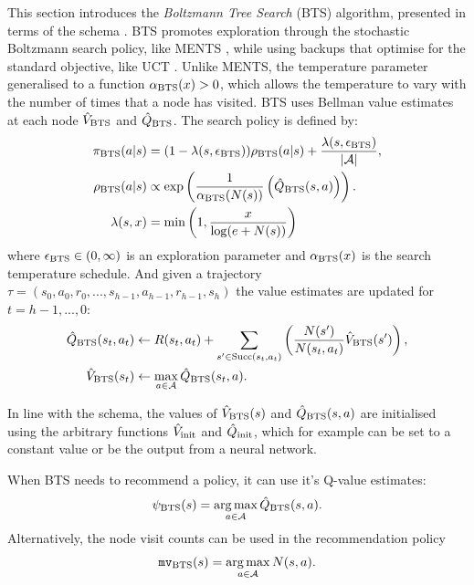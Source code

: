         This section introduces the \textit{Boltzmann Tree Search} (BTS) algorithm, presented in terms of the \thtspp\ewe schema . BTS promotes exploration through the stochastic Boltzmann search policy, like MENTS , while using backups that optimise for the standard objective, like UCT . Unlike MENTS, the temperature parameter generalised to a function ${\alpha_{{\textnormal{BTS}}}}(x) > 0$, which allows the temperature to vary with the number of times that a node has visited. BTS uses Bellman value estimates at each node ${\hat{V}_{{\textnormal{BTS}}}}$ and ${\hat{Q}_{{\textnormal{BTS}}}}$. The search policy is defined by:
        \begin{align}
            {\pi_{{\textnormal{BTS}}}}(a|s) &= (1-{\lambda(s,{\epsilon_{{\textnormal{BTS}}}})}){\rho_{{\textnormal{BTS}}}}(a|s) + \frac{{\lambda(s,{\epsilon_{{\textnormal{BTS}}}})}}{|\mathcal{A}|}, 
                        \label{eq:4:bts_search_policy} \\ 
            {\rho_{{\textnormal{BTS}}}}(a|s) &\propto \exp\left(\frac{1}{{\alpha_{{\textnormal{BTS}}}}(N(s))}\left({\hat{Q}_{{\textnormal{BTS}}}}(s,a)\right)\right).
                        \label{eq:4:bts_value_policy} \\
            \lambda(s,x) &= \min\left(1, \frac{x}{\log(e+N(s))}\right) \label{eq:4:lambda}
        \end{align}
        where ${\epsilon_{{\textnormal{BTS}}}} \in (0,\infty)$ is an exploration parameter and ${\alpha_{{\textnormal{BTS}}}}(x)$ is the search temperature schedule.  And given a trajectory $\tau=(s_0,a_0,r_0,...,s_{h-1},a_{h-1},r_{h-1},s_h)$ the value estimates are updated for $t=h-1,...,0$:
        \begin{align}
            {\hat{Q}_{{\textnormal{BTS}}}}(s_t,a_t) &\leftarrow 
                R(s_t,a_t) + \sum_{s' \in {\textnormal{Succ}(s_t,a_t)}} \left( \frac{N(s')}{N(s_t,a_t)} {\hat{V}_{{\textnormal{BTS}}}}(s') \right), 
                        \label{eq:4:bts_backup_q} \\ 
            {\hat{V}_{{\textnormal{BTS}}}}(s_t) &\leftarrow \max_{a\in\mathcal{A}} {\hat{Q}_{{\textnormal{BTS}}}}(s_t,a).
                        \label{eq:4:bts_backup_v} 
        \end{align}
        
        In line with the \thtspp\ewe schema, the values of $\hat{V}_{{\textnormal{BTS}}}(s)$ and $\hat{Q}_{{\textnormal{BTS}}}(s,a)$ are initialised using the arbitrary functions ${\hat{V}_{\textnormal{init}}}$ and ${\hat{Q}_{\textnormal{init}}}$, which for example can be set to a constant value or be the output from a neural network.  
        
        
        When BTS needs to recommend a policy, it can use it's Q-value estimates:
        \begin{align}
            {\psi_{{\textnormal{BTS}}}}(s)=\operatorname*{arg\,max}_{a\in\mathcal{A}}{\hat{Q}_{{\textnormal{BTS}}}}(s,a).
        \end{align}
        Alternatively, the node visit counts can be used in the recommendation policy
        \begin{align}
            \texttt{mv}_{{\textnormal{BTS}}}(s) = \operatorname*{arg\,max}_{a\in\mathcal{A}} N(s,a).
        \end{align}

